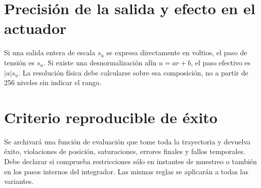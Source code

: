 \section{Precisión de la salida y efecto en el actuador}
Si una salida entera de escala $s_u$ se expresa directamente en voltios, el paso de tensión es $s_u$. Si existe una desnormalización afín $u=a\widehat r+b$, el paso efectivo es $|a|s_u$. La resolución física debe calcularse sobre esa composición, no a partir de 256 niveles sin indicar el rango.

\section{Criterio reproducible de éxito}
Se archivará una función de evaluación que tome toda la trayectoria y devuelva éxito, violaciones de posición, saturaciones, errores finales y fallos temporales. Debe declarar si comprueba restricciones sólo en instantes de muestreo o también en los pasos internos del integrador. Las mismas reglas se aplicarán a todas las variantes.
